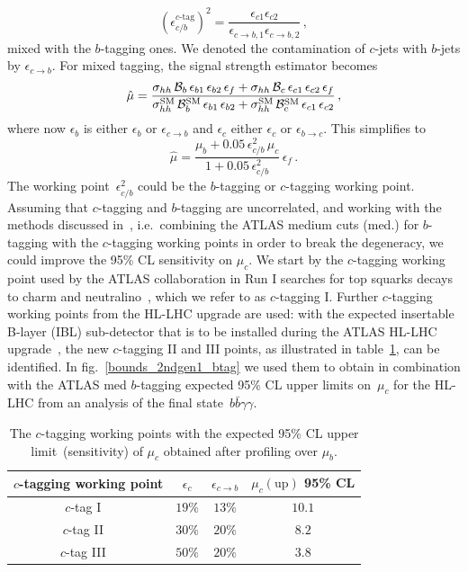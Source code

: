 \begin{equation}
	\left( \epsilon_{c/b}^{\text{$c$-tag}}\right)^2 = \frac{\epsilon_{c1}  \epsilon_{c2} }{\epsilon_{c \to b,1} \epsilon_{c \to b,2}}\,,
\end{equation}
mixed with the  $b$-tagging ones. We denoted  the contamination of $c$-jets with $b$-jets by $\epsilon_{c \to b}$.  For mixed tagging,  the signal strength estimator becomes
\begin{equation}
	\hat \mu = \frac{\sigma_{hh}\, \mathcal B_b \,\epsilon_{b1}\,\epsilon_{b2} \, \epsilon_f+\sigma_{hh}\, \mathcal B_c  \,\epsilon_{c1}\,\epsilon_{c2} \,\epsilon_f }{\sigma_{hh}^{\mathrm{SM}}\, \mathcal B_b^{\mathrm{SM}}\, \epsilon_{b1}\,\epsilon_{b2}
		+\sigma_{hh}^{\mathrm{SM}}\, \mathcal B_c^{\mathrm{SM}}\, \epsilon_{c1}\,\epsilon_{c2}
	} \,,
\end{equation}
where now $\epsilon_{b}$ is either $\epsilon_{b}$ or $\epsilon_{c\to b}$  and $\epsilon_{c}$ either $\epsilon_{c}$ or $\epsilon_{b\to c}$.
This simplifies to
\begin{equation}
	\hat \mu  = \frac{\mu_b+0.05\,\epsilon_{c/b}^2\,\mu_c}{1+0.05\,\epsilon_{c/b}^2}\, \epsilon_f\,.
\end{equation}
The working point~$\epsilon_{c/b}^2$ could be the $b$-tagging or $c$-tagging working point.
Assuming that $c$-tagging and $b$-tagging are uncorrelated, and working with the methods discussed in~\cite{Perez:2015aoa,Perez:2015lra}, i.e.~combining the ATLAS medium cuts (med.) for $b$-tagging with the $c$-tagging working points in order to break the degeneracy, we could improve the 95\% CL sensitivity on $\mu_c$.
We start by the $c$-tagging working point used by the ATLAS collaboration in Run I searches for top squarks decays to charm and neutralino~\cite{Aad:2015gna,ATLAS-CONF-2013-063}, which we refer to as $c$-tagging I.
Further $c$-tagging working points from the HL-LHC upgrade are used: with the expected insertable B-layer (IBL) sub-detector that is to be installed during the ATLAS HL-LHC upgrade~\cite{Capeans:1291633,ATL-PHYS-PUB-2015-018}, the new $c$-tagging II and III points, as illustrated in table~\ref{ctag_wp},
can be identified. In fig.~\ref{bounds_2ndgen1_btag}  we used them to obtain in combination with the ATLAS med $b$-tagging expected 95\% CL upper limits on~$\mu_c$ for the HL-LHC from an analysis of the final state~$b\bar{b}\gamma\gamma$.
\begin{table}
	\centering
	\begin{tabular}{cccc}
		\toprule
		$c$-tagging working point	&$\epsilon_{c}$	& $\epsilon_{c \to b}$ & $\mu_c(\mathrm{up})$ 95\% CL  \\
		\midrule
		$c$-tag I ~\cite{Aad:2015gna,ATLAS-CONF-2013-063}
		& $19\%$ & $13 \%$ & $ 10.1$\\
		$c$-tag II ~\cite{Capeans:1291633,ATL-PHYS-PUB-2015-018}
		& $30\%$ & $20 \%$ & $ 8.2$\\
		$c$-tag III ~\cite{Capeans:1291633,ATL-PHYS-PUB-2015-018}
		& $50\%$ & $20 \%$ & $ 3.8$\\
		\bottomrule
	\end{tabular}
	\caption{The $c$-tagging working points with the expected 95\% CL upper limit~(sensitivity) of $\mu_c$ obtained after profiling over $\mu_b$. }
	\label{ctag_wp}
\end{table}
